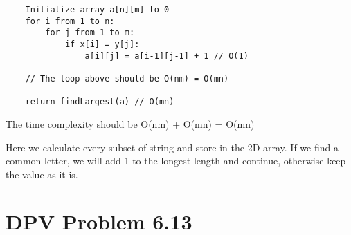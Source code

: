 \documentclass{article}
\begin{document}
\begin{verbatim}
    Initialize array a[n][m] to 0
    for i from 1 to n:
        for j from 1 to m: 
            if x[i] = y[j]:
                a[i][j] = a[i-1][j-1] + 1 // O(1)
    
    // The loop above should be O(nm) = O(mn)
    
    return findLargest(a) // O(mn)
\end{verbatim}

The time complexity should be O(nm) + O(mn) = O(mn)

Here we calculate every subset of string and store in the 2D-array. If we find a common letter, we will add 1 to the longest length and continue, otherwise keep the value as it is.

\section{DPV Problem 6.13} 
\end{document}
